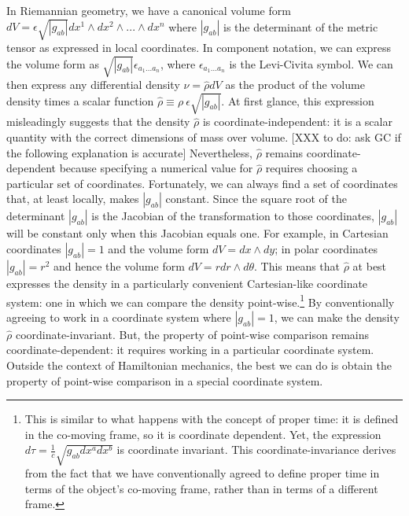 \documentclass[letterpaper]{article}
\begin{document}
In Riemannian geometry, we have a canonical volume form $dV = \epsilon \sqrt{|g_{ab}|} dx^1 \wedge dx^2 \wedge ... \wedge dx^n$ where $|g_{ab}|$ is the determinant of the metric tensor as expressed in local coordinates. In component notation, we can express the volume form as $\sqrt{|g_{ab}|}\epsilon_{a_1 ... a_n}$, where $\epsilon_{a_1 ... a_n}$ is the Levi-Civita symbol. We can then express any differential density $\nu = \hat{\rho} dV$ as the product of the volume density times a scalar function $\hat{\rho} \equiv \rho \ \epsilon \sqrt{|g_{ab}|}$. At first glance, this expression misleadingly suggests that the density $\hat{\rho}$ is coordinate-independent: it is a scalar quantity with the correct dimensions of mass over volume. [XXX to do: ask GC if the following explanation is accurate] Nevertheless, $\hat{\rho}$ remains coordinate-dependent because specifying a numerical value for $\hat{\rho}$ requires choosing a particular set of coordinates. Fortunately, we can always find a set of coordinates that, at least locally, makes $|g_{ab}|$ constant. Since the square root of the determinant $|g_{ab}|$ is the Jacobian of the transformation to those coordinates, $|g_{ab}|$ will be constant only when this Jacobian equals one. For example, in Cartesian coordinates $|g_{ab}| = 1$ and the volume form $dV = dx \wedge dy$; in polar coordinates $|g_{ab}| = r^2$ and hence the volume form $dV = r dr \wedge d\theta$. This means that $\hat{\rho}$ at best expresses the density in a particularly convenient Cartesian-like coordinate system: one in which we can compare the density point-wise.\footnote{This is similar to what happens with the concept of proper time: it is defined in the co-moving frame, so it is coordinate dependent. Yet, the expression $d\tau = \frac{1}{c} \sqrt{g_{ab} dx^a dx^b}$ is coordinate invariant. This coordinate-invariance derives from the fact that we have conventionally agreed to define proper time in terms of the object's co-moving frame, rather than in terms of a different frame.} By conventionally agreeing to work in a coordinate system where $|g_{ab}| = 1$, we can make the density $\hat{\rho}$ coordinate-invariant. But, the property of point-wise comparison remains coordinate-dependent: it requires working in a particular coordinate system. Outside the context of Hamiltonian mechanics, the best we can do is obtain the property of point-wise comparison in a special coordinate system.
\end{document}
